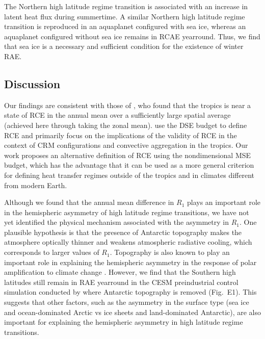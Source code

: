 \documentclass{ametsocV5}
\begin{document}
The Northern high latitude regime transition is associated with an increase in latent heat flux during summertime. A similar Northern high latitude regime transition is reproduced in an aquaplanet configured with sea ice, whereas an aquaplanet configured without sea ice remains in RCAE yearround. Thus, we find that sea ice is a necessary and sufficient condition for the existence of winter RAE.

\subsection{Discussion}
Our findings are consistent with those of \cite{jakob2019}, who found that the tropics is near a state of RCE in the annual mean over a sufficiently large spatial average (achieved here through taking the zonal mean). \cite{jakob2019} use the DSE budget to define RCE and primarily focus on the implications of the validity of RCE in the context of CRM configurations and convective aggregation in the tropics. Our work proposes an alternative definition of RCE using the nondimensional MSE budget, which has the advantage that it can be used as a more general criterion for defining heat transfer regimes outside of the tropics and in climates different from modern Earth.

Although we found that the annual mean difference in $R_1$ plays an important role in the hemispheric asymmetry of high latitude regime transitions, we have not yet identified the physical mechanism associated with the asymmetry in $R_1$. One plausible hypothesis is that the presence of Antarctic topography makes the atmosphere optically thinner and weakens atmospheric radiative cooling, which corresponds to larger values of $R_1$. Topography is also known to play an important role in explaining the hemispheric asymmetry in the response of polar amplification to climate change \citep{salzmann2017,hahn2020,singh2020}. However, we find that the Southern high latitudes still remain in RAE yearround in the CESM preindustrial control simulation conducted by \cite{hahn2020} where Antarctic topography is removed (Fig.~E1). This suggests that other factors, such as the asymmetry in the surface type (sea ice and ocean-dominated Arctic vs ice sheets and land-dominated Antarctic), are also important for explaining the hemispheric asymmetry in high latitude regime transitions.
\end{document}
